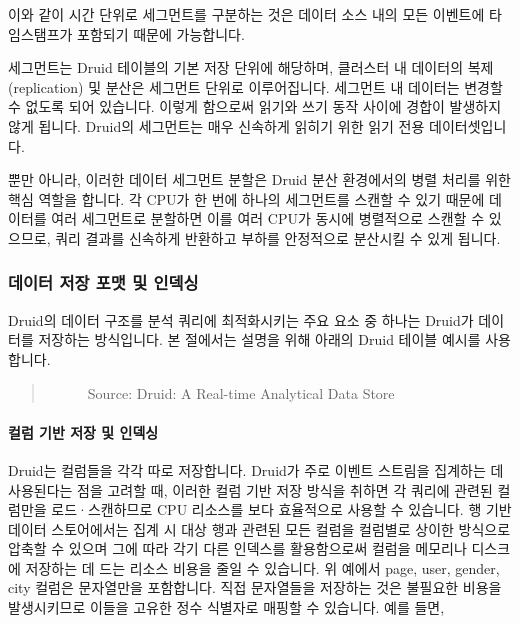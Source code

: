 \documentclass[letterpaper,10pt,english]{sphinxmanual}
\begin{document}
이와 같이 시간 단위로 세그먼트를 구분하는 것은 데이터 소스 내의 모든 이벤트에 타임스탬프가 포함되기 때문에 가능합니다.

세그먼트는 Druid 테이블의 기본 저장 단위에 해당하며, 클러스터 내 데이터의 복제(replication) 및 분산은 세그먼트 단위로 이루어집니다. 세그먼트 내 데이터는 변경할 수 없도록 되어 있습니다. 이렇게 함으로써 읽기와 쓰기 동작 사이에 경합이 발생하지 않게 됩니다. Druid의 세그먼트는 매우 신속하게 읽히기 위한 읽기 전용 데이터셋입니다.

뿐만 아니라, 이러한 데이터 세그먼트 분할은 Druid 분산 환경에서의 병렬 처리를 위한 핵심 역할을 합니다. 각 CPU가 한 번에 하나의 세그먼트를 스캔할 수 있기 때문에 데이터를 여러 세그먼트로 분할하면 이를 여러 CPU가 동시에 병렬적으로 스캔할 수 있으므로, 쿼리 결과를 신속하게 반환하고 부하를 안정적으로 분산시킬 수 있게 됩니다.


\subsubsection{데이터 저장 포맷 및 인덱싱}
\label{\detokenize{discovery/part01/druid_features:id2}}
Druid의 데이터 구조를 분석 쿼리에 최적화시키는 주요 요소 중 하나는 Druid가 데이터를 저장하는 방식입니다. 본 절에서는 설명을 위해 아래의 Druid 테이블 예시를 사용합니다.
\begin{quote}

\begin{figure}[H]
\centering
\capstart

\noindent{}
\caption{Source: Druid: A Real-time Analytical Data Store}\label{\detokenize{discovery/part01/druid_features:id8}}\end{figure}
\end{quote}


\paragraph{컬럼 기반 저장 및 인덱싱}
\label{\detokenize{discovery/part01/druid_features:id3}}
Druid는 컬럼들을 각각 따로 저장합니다. Druid가 주로 이벤트 스트림을 집계하는 데 사용된다는 점을 고려할 때, 이러한 컬럼 기반 저장 방식을 취하면 각 쿼리에 관련된 컬럼만을 로드·스캔하므로 CPU 리소스를 보다 효율적으로 사용할 수 있습니다. 행 기반 데이터 스토어에서는 집계 시 대상 행과 관련된 모든 컬럼을 컬럼별로 상이한 방식으로 압축할 수 있으며 그에 따라 각기 다른 인덱스를 활용함으로써 컬럼을 메모리나 디스크에 저장하는 데 드는 리소스 비용을 줄일 수 있습니다. 위 예에서 page, user, gender, city 컬럼은 문자열만을 포함합니다. 직접 문자열들을 저장하는 것은 불필요한 비용을 발생시키므로 이들을 고유한 정수 식별자로 매핑할 수 있습니다. 예를 들면,
\end{document}
